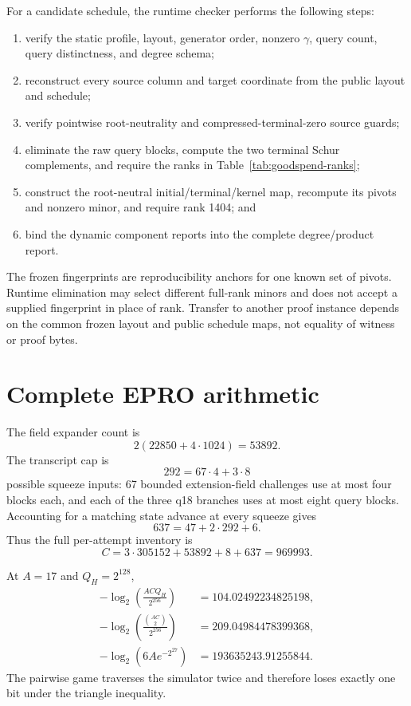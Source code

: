 For a candidate schedule, the runtime checker performs the following steps:
\begin{enumerate}
  \item verify the static profile, layout, generator order, nonzero
        \(\gamma\), query count, query distinctness, and degree schema;
  \item reconstruct every source column and target coordinate from the public
        layout and schedule;
  \item verify pointwise root-neutrality and compressed-terminal-zero source
        guards;
  \item eliminate the raw query blocks, compute the two terminal Schur
        complements, and require the ranks in
        Table~\ref{tab:goodspend-ranks};
  \item construct the root-neutral initial/terminal/kernel map, recompute its
        pivots and nonzero minor, and require rank 1404; and
  \item bind the dynamic component reports into the complete degree/product
        report.
\end{enumerate}
The frozen fingerprints are reproducibility anchors for one known set of
pivots.  Runtime elimination may select different full-rank minors and does
not accept a supplied fingerprint in place of rank.  Transfer to another
proof instance depends on the common frozen layout and public schedule maps,
not equality of witness or proof bytes.

\section{Complete EPRO arithmetic}
\label{app:epro-ledger}

The field expander count is
\[
 2(22850+4\cdot1024)=53892.
\]
The transcript cap is
\[
 292=67\cdot4+3\cdot8
\]
possible squeeze inputs: 67 bounded extension-field challenges use at most
four blocks each, and each of the three q18 branches uses at most eight query
blocks.  Accounting for a matching state advance at every squeeze gives
\[
 637=47+2\cdot292+6.
\]
Thus the full per-attempt inventory is
\[
 C=3\cdot305152+53892+8+637=969993.
\]

At \(A=17\) and \(Q_H=2^{128}\),
\begin{align*}
 -\log_2\left(\frac{ACQ_H}{2^{256}}\right)
    &=104.02492234825198,\\
 -\log_2\left(\frac{\binom{AC}{2}}{2^{256}}\right)
    &=209.04984478399368,\\
 -\log_2\left(6A e^{-2^{27}}\right)
    &=193635243.91255844.
\end{align*}
The pairwise game traverses the simulator twice and therefore loses exactly
one bit under the triangle inequality.

